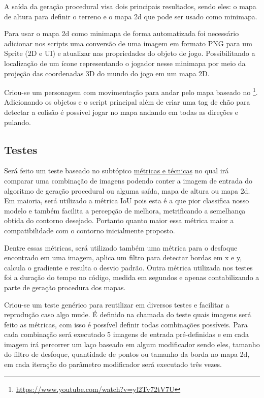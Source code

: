 A saída da geração procedural visa dois principais resultados, sendo eles: o mapa de altura para definir o terreno e o mapa 2d que pode ser usado como minimapa.

Para usar o mapa 2d como minimapa de forma automatizada foi necessário adicionar nos scripts uma conversão de uma imagem em formato PNG para um Sprite (2D e UI) e atualizar nas propriedades do objeto de jogo. Possibilitando a localização de um ícone representando o jogador nesse minimapa por meio da projeção das coordenadas 3D do mundo do jogo em um mapa 2D.


Criou-se um personagem com movimentação para andar pelo mapa baseado no \footnote{\url{https://www.youtube.com/watch?v=yl2Tv72tV7U}}. Adicionando os objetos e o script principal além de criar uma tag de chão para detectar a colisão é possível jogar no mapa andando em todas as direções e pulando.
\subsection{Testes}

Será feito um teste baseado no subtópico \hyperref[sec:metricas_tecnicas]{métricas e técnicas} no qual irá comparar uma combinação de imagens podendo conter a imagem de entrada do algoritmo de geração procedural ou alguma saída, mapa de altura ou mapa 2d. Em maioria, será utilizado a métrica IoU pois esta é a que pior classifica nosso modelo e também facilita a percepção de melhora, metrificando a semelhança obtida do contorno desejado. Portanto quanto maior essa métrica maior a compatibilidade com o contorno inicialmente proposto.

Dentre essas métricas, será utilizado também uma métrica para o desfoque encontrado em uma imagem, aplica um filtro para detectar bordas em x e y, calcula o gradiente e resulta o desvio padrão. Outra métrica utilizada nos testes foi a duração do tempo no código, medida em segundos e apenas contabilizando a parte de geração procedura dos mapas.

Criou-se um teste genérico para reutilizar em diversos testes e facilitar a reprodução caso algo mude. É definido na chamada do teste quais imagens será feito as métricas, com isso é possível definir todas combinações possíveis. Para cada combinação será executado 5 imagens de entrada pré-definidas e em cada imagem irá percorrer um laço baseado em algum modificador sendo eles, tamanho do filtro de desfoque, quantidade de pontos ou tamanho da borda no mapa 2d, em cada iteração do parâmetro modificador será executado três vezes.

